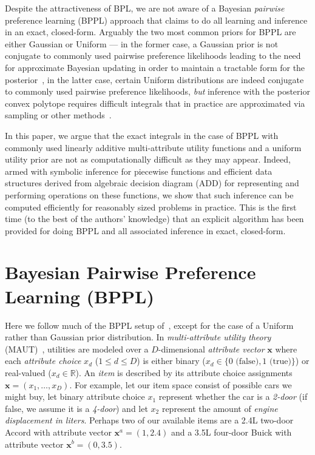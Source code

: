 \documentclass{article} %
\newcommand{\R}{\mathbb{R}}
\renewcommand{\vec}[1]{\mathbf{#1}}
\begin{document}
Despite the attractiveness of BPL, we are not aware of a Bayesian
\emph{pairwise} preference learning (BPPL) approach that claims to do
all learning and inference in an exact, closed-form.  Arguably the two
most common priors for BPPL are either Gaussian or Uniform --- in the
former case, a Gaussian prior is not conjugate to commonly used
pairwise preference likelihoods leading to the need for approximate
Bayesian updating in order to maintain a tractable form for the
posterior~\cite{Chajewska00utilitiesas,boutilier02239,zoubin_gp,sanner:aistats10}, in
the latter case, certain Uniform distributions are indeed conjugate to
commonly used pairwise preference likelihoods, \emph{but} inference
with the posterior convex polytope requires difficult integrals 
that in practice are approximated via sampling or other
methods~\cite{Chajewska01learningan,viappiani_nips}.

In this paper, we argue that the exact integrals in the case of BPPL
with commonly used linearly additive multi-attribute utility functions
and a uniform utility prior are not as computationally difficult as
they may appear.  Indeed, armed with symbolic inference for piecewise
functions and efficient data structures derived from algebraic
decision diagram (ADD) for representing and performing operations on
these functions, we show that such inference can be computed
efficiently for reasonably sized problems in practice.
This is the first time (to the best of the authors' knowledge) that an
explicit algorithm has been provided for doing BPPL and all associated
inference in exact, closed-form.

\section{Bayesian Pairwise Preference Learning (BPPL)}

Here we follow much of the BPPL setup of~\cite{sanner:aistats10},
except for the case of a Uniform rather than Gaussian prior distribution.  
In \emph{multi-attribute
utility theory} (MAUT)~\cite{keeney_raiffa76}, utilities are modeled
over a $D$-dimensional \emph{attribute vector} $\vec{x}$ where each
\emph{attribute choice} $x_d$ ($1 \leq d \leq D$) is either binary
($x_d \in \{0 \mbox{ (false)},1 \mbox{ (true)}\}$) or real-valued
($x_d \in \R$).  An \emph{item} is described by its attribute choice
assignments $\vec{x}=(x_{1},\dots,x_{D})$.  For example, let our
item space consist of possible cars we might buy, let binary attribute
choice $x_1$ represent whether the car is a \emph{2-door} (if false,
we assume it is a \emph{4-door}) and let $x_2$ represent the amount of
\emph{engine displacement in liters}.  Perhaps two of our available
items are a 2.4L two-door Accord with attribute vector $\vec{x}^a =
(1,2.4)$ and a 3.5L four-door Buick with attribute vector $\vec{x}^b =
(0,3.5)$.
\end{document}
